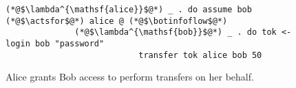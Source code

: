 \begin{figure}
\centering
\begin{lstlisting}
(*@$\lambda^{\mathsf{alice}}$@*) _ . do assume bob (*@$\actsfor$@*) alice @ (*@$\botinfoflow$@*)
              (*@$\lambda^{\mathsf{bob}}$@*) _ . do tok <- login bob "password"
                           transfer tok alice bob 50
\end{lstlisting}
\caption{Alice grants Bob access to perform transfers on her behalf.}
\label{fig:bob-transfer-from-alice}
\end{figure}